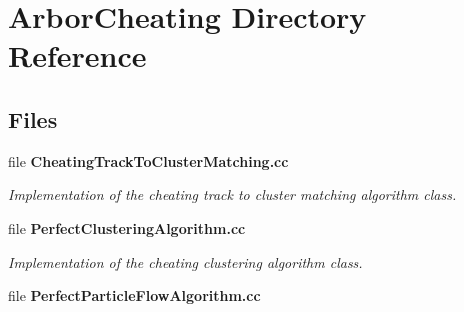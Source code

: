 \section{Arbor\+Cheating Directory Reference}
\label{dir_ab138cf6596b986f1921c38292d5c78c}
\subsection*{Files}
\begin{DoxyCompactItemize}
\item 
file {\bf Cheating\+Track\+To\+Cluster\+Matching.\+cc}
\begin{DoxyCompactList}\small\item\em Implementation of the cheating track to cluster matching algorithm class. \end{DoxyCompactList}\item 
file {\bf Perfect\+Clustering\+Algorithm.\+cc}
\begin{DoxyCompactList}\small\item\em Implementation of the cheating clustering algorithm class. \end{DoxyCompactList}\item 
file {\bf Perfect\+Particle\+Flow\+Algorithm.\+cc}
\end{DoxyCompactItemize}
